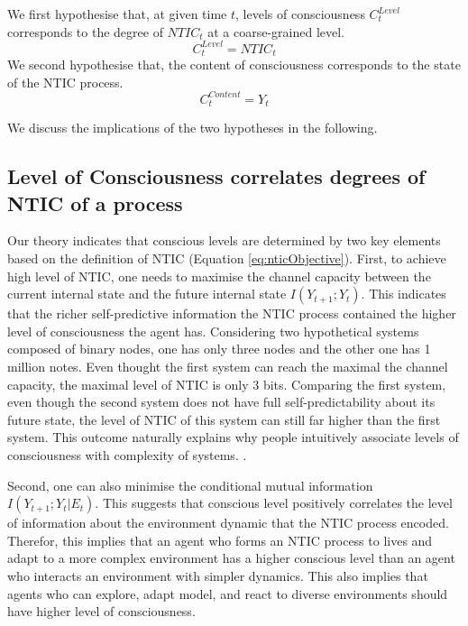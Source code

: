 		We first hypothesise that, at given time $t$, levels of consciousness $C_{t}^{Level}$ corresponds to the degree of $NTIC_{t}$ at a coarse-grained level.
			\begin{equation}\label{eq:cLevel}
				C_{t}^{Level} = NTIC_{t}
			\end{equation}
		We second hypothesise that, the content of consciousness corresponds to the state of the NTIC process.
			\begin{equation}\label{eq:cContent}
				C_{t}^{Content} = Y_{t}
			\end{equation}
		
		We discuss the implications of the two hypotheses in the following.

		\subsection{Level of Consciousness correlates degrees of NTIC of a process}
		
		Our theory indicates that conscious levels are determined by two key elements based on the definition of NTIC (Equation \ref{eq:nticObjective}). First, to achieve high level of NTIC, one needs to maximise the channel capacity between the current internal state and the future internal state $I(Y_{t+1};Y_{t})$. This indicates that the richer self-predictive information the NTIC process contained the higher level of consciousness the agent has. Considering two hypothetical systems composed of binary nodes, one has only three nodes and the other one has 1 million notes. Even thought the first system can reach the maximal the channel capacity, the maximal level of NTIC is only 3 bits. Comparing the first system, even though the second system does not have full self-predictability about its future state, the level of NTIC of this system can still far higher than the first system. This outcome naturally explains why people intuitively associate levels of consciousness with complexity of systems. . 
		
		Second, one can also minimise the conditional mutual information  $I(Y_{t+1};Y_{t}|E_{t})$. This suggests that conscious level positively correlates the level of information about the environment dynamic that the NTIC process encoded. Therefor, this implies that an agent who forms an NTIC process to lives and adapt to a more complex environment has a higher conscious level than an agent who interacts an environment with simpler dynamics. This also implies that agents who can explore, adapt model, and react to diverse environments should have higher level of consciousness. 
		
